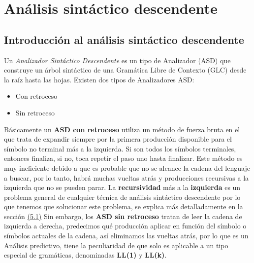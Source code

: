 \chapter{Análisis sintáctico descendente}
\section{Introducción al análisis sintáctico descendente}

Un \textit{Analizador Sintáctico Descendente} es un tipo de Analizador (ASD) que construye un árbol sintáctico de una Gramática Libre de Contexto (GLC) desde la raíz hasta las hojas. \cite{PL1}
\newline
\newline
Existen dos tipos de Analizadores ASD:
\begin{itemize}
	\item Con retroceso
	\item Sin retroceso
\end{itemize}
Básicamente un \textbf{ASD con retroceso} utiliza un método de fuerza bruta en el que trata de expandir siempre por la primera producción disponible para el símbolo no terminal más a la izquierda. Si son todos los símbolos terminales, entonces finaliza, si no, toca repetir el paso uno hasta finalizar.
\newline
\newline
Este método es muy ineficiente debido a que es probable que no se alcance la cadena del lenguaje a buscar, por lo tanto, habrá muchas vueltas atrás y producciones recursivas a la izquierda que no se pueden parar.
\newline
\newline
La \textbf{recursividad} más a la \textbf{izquierda} es un problema general de cualquier técnica de análisis sintáctico descendente por lo que tenemos que solucionar este problema, se explica más detalladamente en la sección \hyperref[sec:hello]{(5.1)}
\newline
\newline
Sin embargo, los \textbf{ASD sin retroceso} tratan de leer la cadena de izquierda a derecha, predecimos qué producción aplicar en función del símbolo o símbolos actuales de la cadena, así eliminamos las vueltas atrás, por lo que es un Análisis predictivo, tiene la peculiaridad de que solo es aplicable a un tipo especial de gramáticas, denominadas \textbf{LL(1)} y \textbf{LL(k)}.

\clearpage

